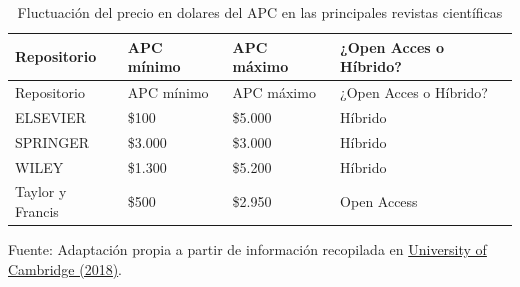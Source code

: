 \documentclass[
  spanish,
  a4paper,
  oneside]{scrbook}
\begin{document}
\begin{longtable}[]{@{}
  >{\raggedright\arraybackslash}p{}
  >{\raggedright\arraybackslash}p{}
  >{\raggedright\arraybackslash}p{}
  >{\raggedright\arraybackslash}p{}@{}}
\caption{Fluctuación del precio en dolares del APC en las principales
revistas científicas}\label{tbl-precio}\tabularnewline
\toprule\noalign{}
\begin{minipage}[b]{\linewidth}\raggedright
Repositorio
\end{minipage} & \begin{minipage}[b]{\linewidth}\raggedright
APC mínimo
\end{minipage} & \begin{minipage}[b]{\linewidth}\raggedright
APC máximo
\end{minipage} & \begin{minipage}[b]{\linewidth}\raggedright
¿Open Acces o Híbrido?
\end{minipage} \\
\midrule\noalign{}
\endfirsthead
\toprule\noalign{}
\begin{minipage}[b]{\linewidth}\raggedright
Repositorio
\end{minipage} & \begin{minipage}[b]{\linewidth}\raggedright
APC mínimo
\end{minipage} & \begin{minipage}[b]{\linewidth}\raggedright
APC máximo
\end{minipage} & \begin{minipage}[b]{\linewidth}\raggedright
¿Open Acces o Híbrido?
\end{minipage} \\
\midrule\noalign{}
\endhead
\bottomrule\noalign{}
\endlastfoot
ELSEVIER & \$100 & \$5.000 & Híbrido \\
SPRINGER & \$3.000 & \$3.000 & Híbrido \\
WILEY & \$1.300 & \$5.200 & Híbrido \\
Taylor y Francis & \$500 & \$2.950 & Open Access \\
\end{longtable}

Fuente: Adaptación propia a partir de información recopilada en
\href{https://www.openaccess.cam.ac.uk/publishing-open-access/how-much-do-publishers-charge-open-access}{University
of Cambridge (2018)}.
\end{document}
